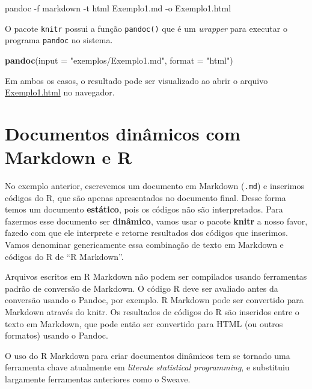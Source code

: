 \documentclass[10pt,a4paper]{book}
\newenvironment{Shaded}{\begin{snugshade}}{\end{snugshade}}
\newcommand{\KeywordTok}[1]{\textcolor[rgb]{0.13,0.29,0.53}{\textbf{#1}}}
\newcommand{\DataTypeTok}[1]{\textcolor[rgb]{0.13,0.29,0.53}{#1}}
\newcommand{\StringTok}[1]{\textcolor[rgb]{0.31,0.60,0.02}{#1}}
\newcommand{\ExtensionTok}[1]{#1}
\newcommand{\NormalTok}[1]{#1}
\begin{document}
\begin{Shaded}
\begin{Highlighting}[]
\ExtensionTok{pandoc}\NormalTok{ -f markdown -t html Exemplo1.md -o Exemplo1.html}
\end{Highlighting}
\end{Shaded}

O pacote \texttt{knitr} possui a função \texttt{pandoc()} que é um
\emph{wrapper} para executar o programa \texttt{pandoc} no sistema.

\begin{Shaded}
\begin{Highlighting}[]
\KeywordTok{pandoc}\NormalTok{(}\DataTypeTok{input =} \StringTok{"exemplos/Exemplo1.md"}\NormalTok{, }\DataTypeTok{format =} \StringTok{"html"}\NormalTok{)}
\end{Highlighting}
\end{Shaded}

Em ambos os casos, o resultado pode ser visualizado ao abrir o arquivo
\href{exemplos/Exemplo1.html}{Exemplo1.html} no navegador.

\section{Documentos dinâmicos com Markdown e
R}\label{documentos-dinuxe2micos-com-markdown-e-r}

No exemplo anterior, escrevemos um documento em Markdown (\texttt{.md})
e inserimos códigos do R, que são apenas apresentados no documento
final. Desse forma temos um documento \textbf{estático}, pois os códigos
não são interpretados. Para fazermos esse documento ser
\textbf{dinâmico}, vamos usar o pacote \textbf{knitr} a nosso favor,
fazedo com que ele interprete e retorne resultados dos códigos que
inserimos. Vamos denominar genericamente essa combinação de texto em
Markdown e códigos do R de ``R Markdown''.

Arquivos escritos em R Markdown não podem ser compilados usando
ferramentas padrão de conversão de Markdown. O código R deve ser
avaliado antes da conversão usando o Pandoc, por exemplo. R Markdown
pode ser convertido para Markdown através do knitr. Os resultados de
códigos do R são inseridos entre o texto em Markdown, que pode então ser
convertido para HTML (ou outros formatos) usando o Pandoc.

O uso do R Markdown para criar documentos dinâmicos tem se tornado uma
ferramenta chave atualmente em \emph{literate statistical programming},
e substituiu largamente ferramentas anteriores como o Sweave.
\end{document}
